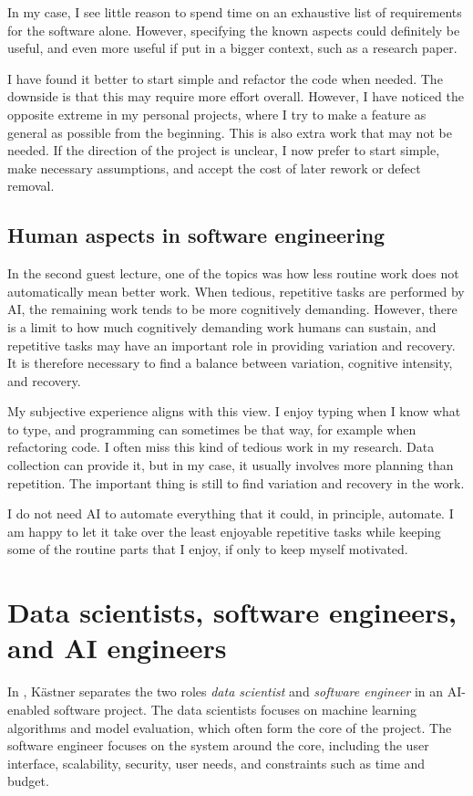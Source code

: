 \documentclass{article}
\begin{document}
In my case, I see little reason to spend time on an exhaustive list of requirements for the software alone. However, specifying the known aspects could definitely be useful,
and even more useful if put in a bigger context, such as a research paper. 

I have found it better to start simple and refactor the code when needed.
The downside is that this may require more effort overall.
However, I have noticed the opposite extreme in my personal projects, where I try to make a feature as general as possible from the beginning. 
This is also extra work that may not be needed. 
If the direction of the project is unclear, I now prefer to start simple, make necessary assumptions, and accept the cost of later rework or defect removal.

\subsection{Human aspects in software engineering}
In the second guest lecture, one of the topics was how less routine work does not automatically mean better work.
When tedious, repetitive tasks are performed by AI, the remaining work tends to be more cognitively demanding.
However, there is a limit to how much cognitively demanding work humans can sustain, and repetitive tasks may have an important role in providing variation and recovery.
It is therefore necessary to find a balance between variation, cognitive intensity, and recovery.

My subjective experience aligns with this view. I enjoy typing when I know what to type, and programming can sometimes be that way, for example when refactoring code.
I often miss this kind of tedious work in my research.
Data collection can provide it, but in my case, it usually involves more planning than repetition.
The important thing is still to find variation and recovery in the work.

I do not need AI to automate everything that it could, in principle, automate. I am happy to let it take over the least enjoyable repetitive tasks while keeping some of the routine parts that I enjoy, if only to keep myself motivated.

\section{Data scientists, software engineers, and AI engineers}
In \cite{kastner2025machine}, Kästner separates the two roles \emph{data scientist} and \emph{software engineer} in an AI-enabled software project.
The data scientists focuses on machine learning algorithms and model evaluation, which often form the core of the project. The software engineer focuses on the system around the core, including the user interface, scalability, security, user needs, and constraints such as time and budget.
\end{document}
